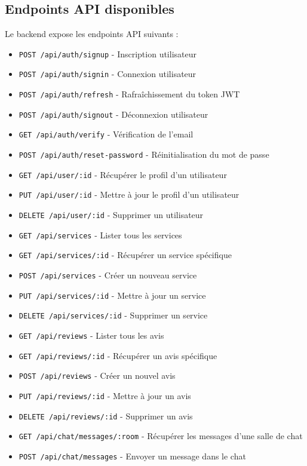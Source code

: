 \documentclass[12pt, a4paper]{article}
\begin{document}
\subsection{Endpoints API disponibles}
Le backend expose les endpoints API suivants :

\begin{multicols}{2}
\begin{itemize}
  \item \texttt{POST /api/auth/signup} - Inscription utilisateur
  \item \texttt{POST /api/auth/signin} - Connexion utilisateur
  \item \texttt{POST /api/auth/refresh} - Rafraîchissement du token JWT
  \item \texttt{POST /api/auth/signout} - Déconnexion utilisateur
  \item \texttt{GET /api/auth/verify} - Vérification de l'email
  \item \texttt{POST /api/auth/reset-password} - Réinitialisation du mot de passe
  \item \texttt{GET /api/user/:id} - Récupérer le profil d'un utilisateur
  \item \texttt{PUT /api/user/:id} - Mettre à jour le profil d'un utilisateur
  \item \texttt{DELETE /api/user/:id} - Supprimer un utilisateur
  \item \texttt{GET /api/services} - Lister tous les services
  \item \texttt{GET /api/services/:id} - Récupérer un service spécifique
  \item \texttt{POST /api/services} - Créer un nouveau service
  \item \texttt{PUT /api/services/:id} - Mettre à jour un service
  \item \texttt{DELETE /api/services/:id} - Supprimer un service
  \item \texttt{GET /api/reviews} - Lister tous les avis
  \item \texttt{GET /api/reviews/:id} - Récupérer un avis spécifique
  \item \texttt{POST /api/reviews} - Créer un nouvel avis
  \item \texttt{PUT /api/reviews/:id} - Mettre à jour un avis
  \item \texttt{DELETE /api/reviews/:id} - Supprimer un avis
  \item \texttt{GET /api/chat/messages/:room} - Récupérer les messages d'une salle de chat
  \item \texttt{POST /api/chat/messages} - Envoyer un message dans le chat

\end{itemize}
\end{multicols}
\end{document}
